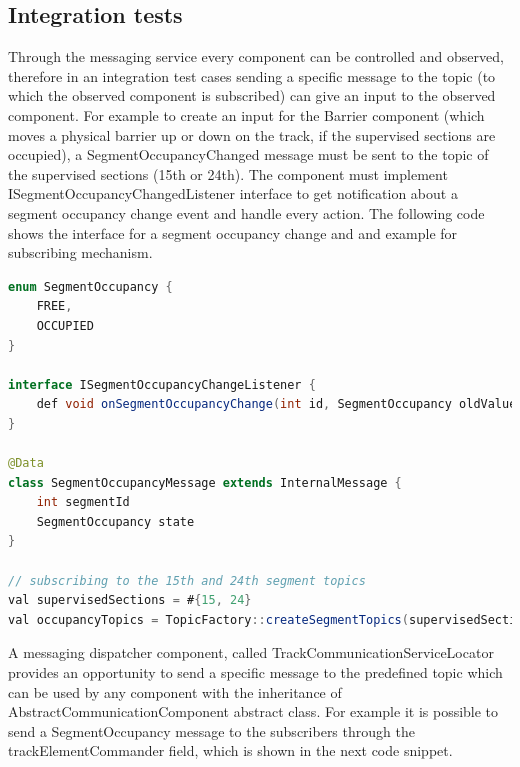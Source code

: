 \subsection{Integration tests}
Through the messaging service every component can be controlled and observed, therefore in an integration test cases sending a specific message to the topic (to which the observed component is subscribed) can give an input to the observed component. For example to create an input for the Barrier component (which moves a physical barrier up or down on the track, if the supervised sections are occupied), a SegmentOccupancyChanged message must be sent to the topic of the supervised sections (15th or 24th). The component must implement ISegmentOccupancyChangedListener interface to get notification about a segment occupancy change event and handle every action. The following code shows the interface for a segment occupancy change and and example for subscribing mechanism.

\begin{lstlisting}[language = Java]
enum SegmentOccupancy {
	FREE,
	OCCUPIED
}

interface ISegmentOccupancyChangeListener {
	def void onSegmentOccupancyChange(int id, SegmentOccupancy oldValue, SegmentOccupancy newValue)
}

@Data
class SegmentOccupancyMessage extends InternalMessage {
	int segmentId
	SegmentOccupancy state
}

// subscribing to the 15th and 24th segment topics
val supervisedSections = #{15, 24}
val occupancyTopics = TopicFactory::createSegmentTopics(supervisedSections, #{SegmentOccupancyMessage}).toSet
\end{lstlisting}

A messaging dispatcher component, called TrackCommunicationServiceLocator provides an opportunity to send a specific message to the predefined topic which can be used by any component with the inheritance of AbstractCommunicationComponent abstract class. For example it is possible to send a SegmentOccupancy message to the subscribers through the trackElementCommander field, which is shown in the next code snippet.

